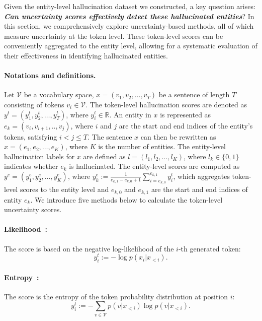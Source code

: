 
Given the entity-level hallucination dataset we constructed, a key question arises: \textbf{\emph{Can uncertainty scores effectively detect these hallucinated entities}}? In this section, we comprehensively explore uncertainty-based methods, all of which measure uncertainty at the token level. These token-level scores can be conveniently aggregated to the entity level, allowing for a systematic evaluation of their effectiveness in identifying hallucinated entities.


\paragraph{Notations and definitions.}
Let $\mathcal{V}$ be a vocabulary space, $x=(v_1, v_2,\dots,v_T)$ be a sentence of length $T$ consisting of tokens $v_i\in\mathcal{V}$. The token-level hallucination scores are denoted as $y^t=(y^t_1,y^t_2,\dots,y^t_T)$, where $y^t_i\in\mathbb{R}$.
An entity in $x$ is represented as $e_k=(v_i, v_{i+1},..,v_j)$, where $i$ and $j$
are the start and end indices of the entity's tokens, satisfying $i<j\leq T$. The sentence $x$ can then be rewritten as $x=(e_1, e_2,\dots,e_K)$, where $K$ is the number of entities. The entity-level hallucination labels for $x$ are defined as $l=(l_1,l_2,\dots,l_K)$, where $l_k\in\{0, 1\}$ indicates whether $e_k$ is hallucinated. The entity-level scores are computed as $y^e=(y^e_1,y^e_2,\dots,y^e_K)$, where $y^e_k:=\frac{1}{e_{k,1}-e_{k,0} + 1}\sum_{i=e_{k,0}}^{e_{k,1}}y^t_i$, 
which aggregates token-level scores to the entity level and $e_{k,0}$ and $e_{k,1}$ are the start and end indices of entity $e_k$. We introduce five methods below to calculate the token-level uncertainty scores.

\vspace{-0.1cm}
\paragraph{Likelihood~\citep{guerreiro-etal-2023-looking}:} The score is based on the negative log-likelihood of the $i$-th generated token: $$y^t_i:=-\log p(x_i|x_{<i}).$$

\vspace{-0.1cm}
\paragraph{Entropy~\citep{malinin2021uncertainty}:} The score is the entropy of the token probability distribution at position $i$:$$y^t_i:=-\sum_{v\in\mathcal{V}}p(v|x_{<i})\log p(v|x_{<i}).$$

